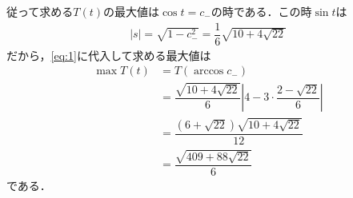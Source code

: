 \documentclass[../../main.tex]{subfiles}
\begin{document}
従って求める$T(t)$の最大値は$\cos t=c_{-}$の時である．この時$\sin t$は
\begin{align}
  |s|=\sqrt{1-c_{-}^2}=\dfrac{1}{6}\sqrt{10+4\sqrt{22}}
\end{align}
だから，\cref{eq:1}に代入して求める最大値は
\begin{align}
  \max T(t)
  &= T(\arccos c_{-}) \\
  &=\dfrac{\sqrt{10+4\sqrt{22}}}{6}\left|4-3\cdot\dfrac{2-\sqrt{22}}{6}\right| \\
  &=\dfrac{(6+\sqrt{22})\sqrt{10+4\sqrt{22}}}{12} \\
  &=\dfrac{\sqrt{409+88\sqrt{22}}}{6}
\end{align}
である．

\newpage
\end{document}
